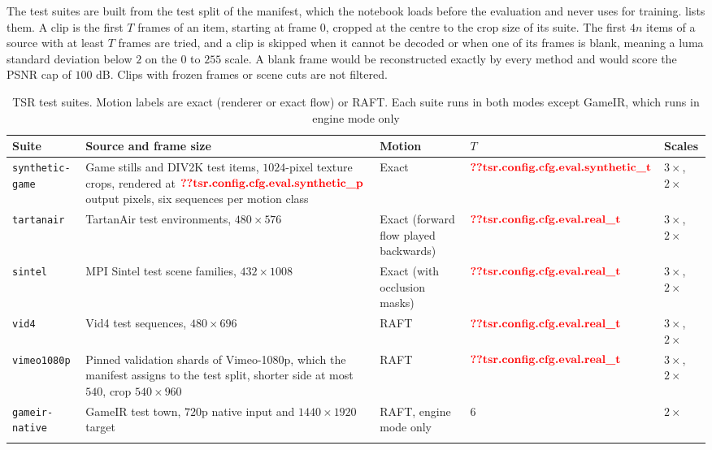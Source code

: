 The test suites are built from the test split of the manifest, which the notebook loads before the evaluation and never uses for training.  lists them. A clip is the first $T$ frames of an item, starting at frame $0$, cropped at the centre to the crop size of its suite. The first $4n$ items of a source with at least $T$ frames are tried, and a clip is skipped when it cannot be decoded or when one of its frames is blank, meaning a luma standard deviation below $2$ on the $0$ to $255$ scale. A blank frame would be reconstructed exactly by every method and would score the PSNR cap of $100$ dB. Clips with frozen frames or scene cuts are not filtered.

\begin{table}[!htbp]
\caption{TSR test suites. Motion labels are exact (renderer or exact flow) or RAFT. Each suite runs in both modes except GameIR, which runs in engine mode only}\label{tab:tsrm-suites}
{\scriptsize\raggedright\setlength{\tabcolsep}{3pt}
\begin{tabular*}{\textwidth}{@{\extracolsep\fill}p{}p{}p{}p{}p{}}
\toprule
Suite & Source and frame size & Motion & $T$ & Scales \\
\midrule
\texttt{synthetic-game} & Game stills and DIV2K \cite{agustsson2017div2k} test items, $1024$-pixel texture crops, rendered at $\Res{tsr.config.cfg.eval.synthetic_p}$ output pixels, six sequences per motion class & Exact & $\Res{tsr.config.cfg.eval.synthetic_t}$ & $3\times$, $2\times$ \\
\texttt{tartanair} & TartanAir \cite{wang2020tartanair} test environments, $480\times576$ & Exact (forward flow played backwards) & $\Res{tsr.config.cfg.eval.real_t}$ & $3\times$, $2\times$ \\
\texttt{sintel} & MPI Sintel \cite{butler2012sintel} test scene families, $432\times1008$ & Exact (with occlusion masks) & $\Res{tsr.config.cfg.eval.real_t}$ & $3\times$, $2\times$ \\
\texttt{vid4} & Vid4 \cite{liu2014vid4} test sequences, $480\times696$ & RAFT & $\Res{tsr.config.cfg.eval.real_t}$ & $3\times$, $2\times$ \\
\texttt{vimeo1080p} & Pinned validation shards of Vimeo-1080p, which the manifest assigns to the test split, shorter side at most $540$, crop $540\times960$ & RAFT & $\Res{tsr.config.cfg.eval.real_t}$ & $3\times$, $2\times$ \\
\texttt{gameir-native} & GameIR \cite{zhou2024gameir} test town, $720$p native input and $1440\times1920$ target & RAFT, engine mode only & $6$ & $2\times$ \\
\botrule
\end{tabular*}}
\end{table}

